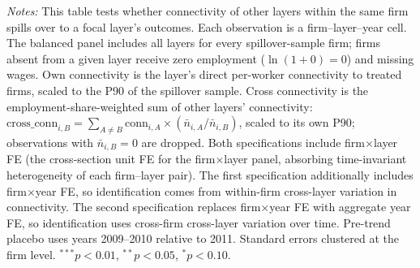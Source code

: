 \begin{table}[H]
\begin{minipage}{\linewidth}
\textit{Notes:} This table tests whether connectivity of other layers within the same firm spills over to a focal layer's outcomes. Each observation is a firm--layer--year cell. The balanced panel includes all layers for every spillover-sample firm; firms absent from a given layer receive zero employment ($\ln(1+0)=0$) and missing wages. Own connectivity is the layer's direct per-worker connectivity to treated firms, scaled to the P90 of the spillover sample. Cross connectivity is the employment-share-weighted sum of other layers' connectivity: $\text{cross\_conn}_{i,B}=\sum_{A\neq B}\text{conn}_{i,A}\times(\bar{n}_{i,A}/\bar{n}_{i,B})$, scaled to its own P90; observations with $\bar{n}_{i,B}=0$ are dropped. Both specifications include firm$\times$layer FE (the cross-section unit FE for the firm$\times$layer panel, absorbing time-invariant heterogeneity of each firm--layer pair). The first specification additionally includes firm$\times$year FE, so identification comes from within-firm cross-layer variation in connectivity. The second specification replaces firm$\times$year FE with aggregate year FE, so identification uses cross-firm cross-layer variation over time. Pre-trend placebo uses years 2009--2010 relative to 2011. Standard errors clustered at the firm level. $^{***}p<0.01$, $^{**}p<0.05$, $^{*}p<0.10$.
\end{minipage}
\end{table}